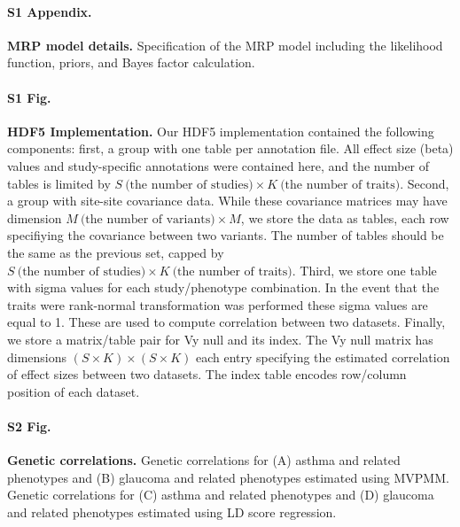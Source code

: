 
\paragraph*{S1 Appendix.}
\label{S1_Appendix}
{\bf MRP model details.} Specification of the MRP model including the likelihood function, priors, and Bayes factor calculation.

\paragraph*{S1 Fig.}
\label{hdf5_fig}
{\bf HDF5 Implementation.} Our HDF5 implementation contained the following components: first, a group with one table per annotation file. All effect size (beta) values and study-specific annotations were contained here, and the number of tables is limited by $S\ \textrm{(the number of studies)} \times K\ \textrm{(the number of traits)}$. Second, a group with site-site covariance data. While these covariance matrices may have dimension $M\ \textrm{(the number of variants)} \times M$, we store the data as tables, each row specifiying the covariance between two variants. The number of tables should be the same as the previous set, capped by $S\ \textrm{(the number of studies)} \times K\ \textrm{(the number of traits)}$. Third, we store one table with sigma values for each study/phenotype combination. In the event that the traits were rank-normal transformation was performed these sigma values are equal to 1. These are used to compute correlation between two datasets. Finally, we store a matrix/table pair for Vy null and its index. The Vy null matrix has dimensions $ (S \times K) \times (S \times K)$ each entry specifying the estimated correlation of effect sizes between two datasets. The index table encodes row/column position of each dataset.

\paragraph*{S2 Fig.}
\label{gcorr_fig}
{\bf Genetic correlations.} Genetic correlations for (A) asthma and related phenotypes and (B) glaucoma and related phenotypes estimated using MVPMM. Genetic correlations for (C) asthma and related phenotypes and (D) glaucoma and related phenotypes estimated using LD score regression.

